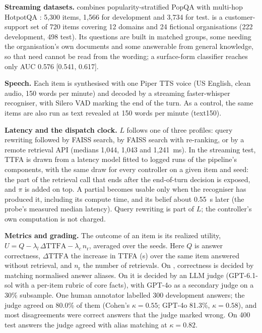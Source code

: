 \textbf{Streaming datasets.}  combines popularity-stratified
PopQA \cite{mallen2023trust} with multi-hop HotpotQA \cite{yang2018hotpotqa}:
5,300 items, 1,566 for development and 3,734 for test.  is a
customer-support set of 720 items covering 12 domains and 24 fictional
organisations (222 development, 498 test). Its questions are built in matched
groups, some needing the organisation's own documents and some answerable from
general knowledge, so that need cannot be read from the wording; a
surface-form classifier reaches only AUC 0.576 [0.541, 0.617].

\textbf{Speech.} Each item is synthesised with one Piper TTS voice (US English,
clean audio, 150 words per minute) and decoded by a streaming faster-whisper
recogniser, with Silero VAD marking the end of the turn. As a control, the same
items are also run as text revealed at 150 words per minute (text150).

\textbf{Latency and the dispatch clock.} $L$ follows one of three profiles:
query rewriting followed by FAISS search, by FAISS search with re-ranking, or
by a remote retrieval API (medians 1,044, 1,043 and 1,241~ms). In the
streaming test, TTFA is drawn from a latency model fitted to logged runs of
the pipeline's components, with the same draw for every controller on a given
item and seed: the part of the retrieval call that ends after the
end-of-turn decision is exposed, and $\pi$ is added on top. A partial becomes
usable only when the recogniser has produced it, including its compute time,
and its belief about 0.55~s later (the probe's measured median latency). Query
rewriting is part of $L$; the controller's own computation is not charged.

\textbf{Metrics and grading.} The outcome of an item is its realized utility,
$U=Q-\lambda_l\,\Delta\mathrm{TTFA}-\lambda_c\,n_{\mathrm r}$, averaged over
the seeds. Here $Q$ is answer correctness, $\Delta\mathrm{TTFA}$ the increase
in TTFA (s) over the same item answered without retrieval, and $n_{\mathrm r}$
the number of retrievals. On , correctness is decided by
matching normalised answer aliases. On  it is decided by an
LLM judge (GPT-6.1-sol with a per-item rubric of core facts), with GPT-4o as a
secondary judge on a 30\% subsample. One human annotator labelled 300
 development answers; the judge agreed on 80.0\% of them
(Cohen's $\kappa=0.55$; GPT-4o 81.3\%, $\kappa=0.58$), and most disagreements
were correct answers that the judge marked wrong. On 400  test
answers the judge agreed with alias matching at $\kappa=0.82$.

